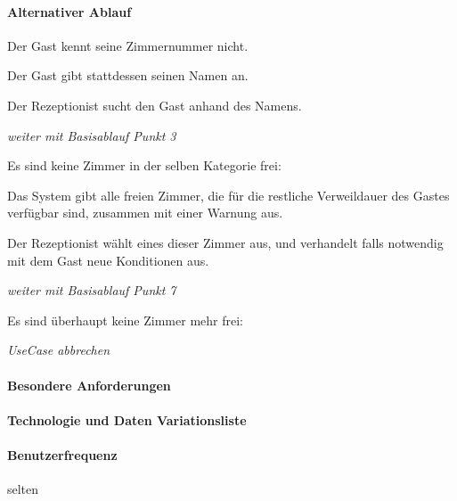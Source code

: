 \paragraph{Alternativer Ablauf}
\begin{longenum}
	\item
	\item
	\begin{longenum}
		\item Der \Gls{Gast} kennt seine Zimmernummer nicht.
		\begin{longenum}
			\item Der \Gls{Gast} gibt stattdessen seinen Namen an.
			\item Der \Gls{Rezeptionist} sucht den Gast anhand des Namens.
			\item \emph{weiter mit Basisablauf Punkt 3}
		\end{longenum}
	\end{longenum}
	\item
	\item
	\item
	\begin{longenum}
		\item Es sind keine \Gls{Zimmer} in der selben Kategorie frei:
		\begin{longenum}
			\item Das System gibt alle freien \Gls{Zimmer}, die für die restliche Verweildauer des \Gls{Gast}es verfügbar sind, zusammen mit einer Warnung aus.
			\item Der \Gls{Rezeptionist} wählt eines dieser Zimmer aus, und verhandelt falls notwendig mit dem \Gls{Gast} neue Konditionen aus.
			\item \emph{weiter mit Basisablauf Punkt 7}
		\end{longenum}
		\item Es sind überhaupt keine \Gls{Zimmer} mehr frei:
		\begin{longenum}
			\item \emph{UseCase abbrechen}
		\end{longenum}
	\end{longenum}
	\item
	\item
\end{longenum}

\paragraph{Besondere Anforderungen}

\paragraph{Technologie und Daten Variationsliste}

\paragraph{Benutzerfrequenz}
selten

\newpage
